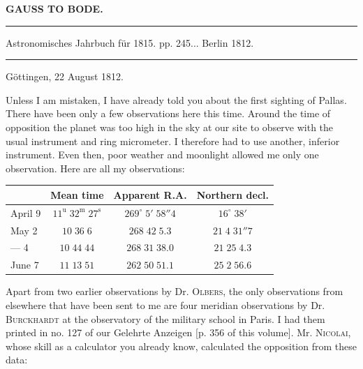 \clearpage{}\hypertarget{native-362-lower}{}\label{native-362-lower}
\begin{center}\textbf{GAUSS TO BODE.}\par\vspace{4pt}\hrule\vspace{4pt}\fontsize{10}{12}\selectfont Astronomisches Jahrbuch für 1815. pp. 245\;... Berlin 1812.\par\vspace{4pt}\hrule\vspace{4pt}\end{center}

\begin{flushright}Göttingen, 22 August 1812.\end{flushright}
\par\indent Unless I am mistaken, I have already told you about the first sighting of Pallas. There have been only a few observations here this time. Around the time of opposition the
planet was too high in the sky at our site to observe with the usual instrument and ring micrometer. I therefore had to use another, inferior instrument. Even then, poor weather and moonlight allowed me only one observation. Here are all my observations:

\begin{center}\fontsize{10}{12}\selectfont\setlength{\tabcolsep}{4pt}\renewcommand{\arraystretch}{1.15}\begin{tabular}{l|c|c|c}
& Mean time & Apparent R.A. & Northern decl.\\\hline
April 9 & $11^{\mathrm u}\;32^{\mathrm m}\;27^{\mathrm s}$ & $269^\circ\;5'\;58''4$ & $16^\circ\;38'$\\
May 2 & $10\;36\;6$ & $268\;42\;5.3$ & $21\;4\;31''7$\\
— 4 & $10\;44\;44$ & $268\;31\;38.0$ & $21\;25\;4.3$\\
June 7 & $11\;13\;51$ & $262\;50\;51.1$ & $25\;2\;56.6$\\
\end{tabular}\end{center}

\par\indent Apart from two earlier observations by Dr. \textsc{Olbers}, the only observations from elsewhere that have been sent to me are four meridian observations by Dr. \textsc{Burckhardt} at the observatory of the military school in Paris. I had them printed in no. 127 of our Gelehrte Anzeigen [p. 356 of this volume]. Mr. \textsc{Nicolai}, whose skill as a calculator you already know, calculated the opposition from these data:

